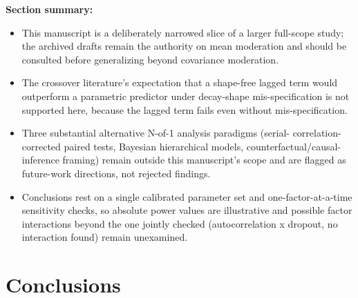 \documentclass[
  11pt,
]{article}
\providecommand{\tightlist}{%
  \setlength{\itemsep}{0pt}\setlength{\parskip}{0pt}}
\begin{document}
\textbf{Section summary:}

\begin{itemize}
\tightlist
\item
  This manuscript is a deliberately narrowed slice of a larger
  full-scope study; the archived drafts remain the authority on mean
  moderation and should be consulted before generalizing beyond
  covariance moderation.
\item
  The crossover literature's expectation that a shape-free lagged
  term would outperform a parametric predictor under decay-shape
  mis-specification is not supported here, because the lagged term
  fails even without mis-specification.
\item
  Three substantial alternative N-of-1 analysis paradigms (serial-
  correlation-corrected paired tests, Bayesian hierarchical models,
  counterfactual/causal-inference framing) remain outside this
  manuscript's scope and are flagged as future-work directions, not
  rejected findings.
\item
  Conclusions rest on a single calibrated parameter set and
  one-factor-at-a-time sensitivity checks, so absolute power values
  are illustrative and possible factor interactions beyond the one
  jointly checked (autocorrelation x dropout, no interaction found)
  remain unexamined.
\end{itemize}

\section{Conclusions}\label{conclusions}
\end{document}
